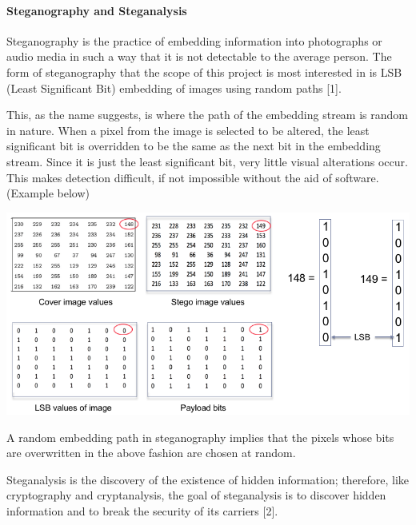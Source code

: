 \documentclass[12pt]{article}
\begin{document}
\paragraph{Steganography and Steganalysis}
\par Steganography is the practice of embedding information into photographs or audio media in such a way that it is not detectable to the average person. The form of steganography that the scope of this project is most interested in is LSB (Least Significant Bit) embedding of images using random paths [1].
\par This, as the name suggests, is where the path of the embedding stream is random in nature. When a pixel from the image is selected to be altered, the least significant bit is overridden to be the same as the next bit in the embedding stream. Since it is just the least significant bit, very little visual alterations occur. This makes detection difficult, if not impossible without the aid of software. (Example below) \\
\begin{center}
\includegraphics[scale=.5]{LBS.png}
\end{center} 
\par A random embedding path in steganography implies that the pixels whose bits are overwritten in the above fashion are chosen at random.
\par Steganalysis is the discovery of the existence of hidden information; therefore, like cryptography and cryptanalysis, the goal of steganalysis is to discover hidden information and to break the security of its carriers [2].
\end{document}
